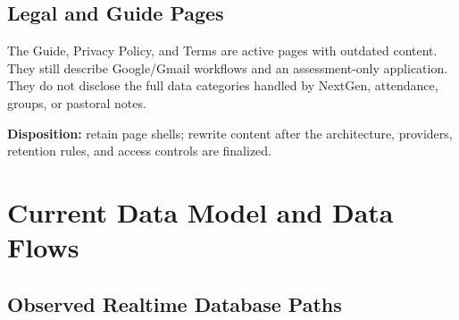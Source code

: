\documentclass[11pt,a4paper,oneside]{report}
\begin{document}
\section{Legal and Guide Pages}

The Guide, Privacy Policy, and Terms are active pages with outdated content. They still describe Google/Gmail workflows and an assessment-only application. They do not disclose the full data categories handled by NextGen, attendance, groups, or pastoral notes.

\textbf{Disposition:} retain page shells; rewrite content after the architecture, providers, retention rules, and access controls are finalized.

\chapter{Current Data Model and Data Flows}

\section{Observed Realtime Database Paths}
\end{document}
